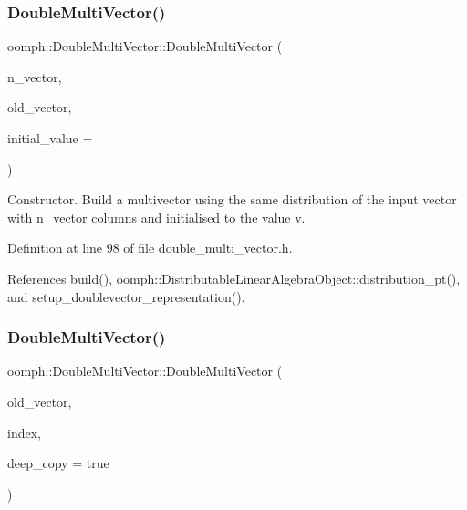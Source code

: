 \subsubsection{\texorpdfstring{Double\+Multi\+Vector()}{DoubleMultiVector()}\hspace{0.1cm}{\footnotesize\ttfamily [4/7]}}
{\footnotesize\ttfamily oomph\+::\+Double\+Multi\+Vector\+::\+Double\+Multi\+Vector (\begin{DoxyParamCaption}\item[{const unsigned \&}]{n\+\_\+vector,  }\item[{const \hyperlink{classoomph_1_1DoubleMultiVector}{Double\+Multi\+Vector} \&}]{old\+\_\+vector,  }\item[{const double \&}]{initial\+\_\+value = {} }\end{DoxyParamCaption})\hspace{0.3cm}{\ttfamily [inline]}}



Constructor. Build a multivector using the same distribution of the input vector with n\+\_\+vector columns and initialised to the value v. 



Definition at line 98 of file double\+\_\+multi\+\_\+vector.\+h.



References build(), oomph\+::\+Distributable\+Linear\+Algebra\+Object\+::distribution\+\_\+pt(), and setup\+\_\+doublevector\+\_\+representation().

\mbox{\label{classoomph_1_1DoubleMultiVector_a38d29d498100228299b29f1dc46b4251}} 
\subsubsection{\texorpdfstring{Double\+Multi\+Vector()}{DoubleMultiVector()}\hspace{0.1cm}{\footnotesize\ttfamily [5/7]}}
{\footnotesize\ttfamily oomph\+::\+Double\+Multi\+Vector\+::\+Double\+Multi\+Vector (\begin{DoxyParamCaption}\item[{const \hyperlink{classoomph_1_1DoubleMultiVector}{Double\+Multi\+Vector} \&}]{old\+\_\+vector,  }\item[{const std\+::vector$<$ int $>$ \&}]{index,  }\item[{const bool \&}]{deep\+\_\+copy = {\ttfamily true} }\end{DoxyParamCaption})\hspace{0.3cm}{\ttfamily [inline]}}



